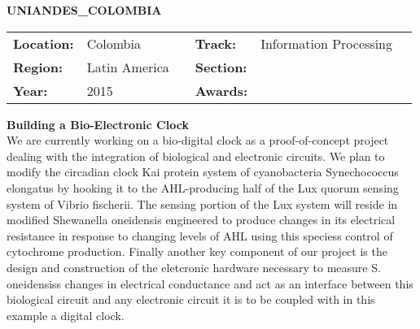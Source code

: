 \textbf{\uppercase{Uniandes\_Colombia}} \FloatBarrier \begin{table}[h] \begin{tabular}{lp{2.5cm}llll} \textbf{Location:} & Colombia & \multicolumn{1}{|l}{} & \textbf{Track:}   & Information Processing \\ \textbf{Region:}   & Latin America   & \multicolumn{1}{|l}{} & \textbf{Section:} &  \\ \textbf{Year:}     & 2015   & \multicolumn{1}{|l}{} & \textbf{Awards:}  & \end{tabular} \end{table} \FloatBarrier \noindent\textbf{Building a Bio-Electronic Clock} \vspace{.2cm}\\ 
We are currently working on a bio-digital clock as a proof-of-concept project dealing with the integration of biological and electronic circuits. We plan to modify the circadian clock Kai protein system of cyanobacteria Synechococcus elongatus by hooking it to the AHL-producing half of the Lux quorum sensing system of Vibrio fischerii. The sensing portion of the Lux system will reside in modified Shewanella oneidensis engineered to produce changes in its electrical resistance in response to changing levels of AHL using this speciess control of cytochrome production. Finally another key component of our project is the design and construction of the eletcronic hardware necessary to measure S. oneidensiss changes in electrical conductance and act as an interface between this biological circuit and any electronic circuit it is to be coupled with in this example a digital clock.
\vspace{2cm} $ $
\pagebreak

